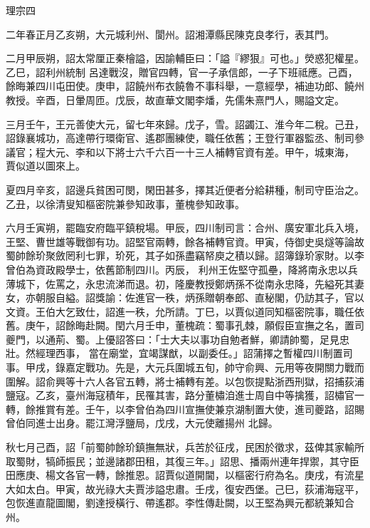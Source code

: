 
\begin{pinyinscope}

 理宗四



 二年春正月乙亥朔，大元城利州、閬州。詔湘潭縣民陳克良孝行，表其門。



 二月甲辰朔，詔太常厘正秦檜謚，因諭輔臣曰：「謚『繆狠』可也。」熒惑犯權星。乙巳，詔利州統制
 呂達戰沒，贈官四轉，官一子承信郎，一子下班祗應。己酉，餘晦兼四川屯田使。庚申，詔饒州布衣饒魯不事科舉，一意經學，補迪功郎、饒州教授。辛酉，日暈周匝。戊辰，故直華文閣李燔，先儒朱熹門人，賜謚文定。



 三月壬午，王元善使大元，留七年來歸。戊子，雪。詔蠲江、淮今年二稅。己丑，詔錄襄城功，高達帶行環衛官、遙郡團練使，職任依舊；王登行軍器監丞、制司參議官；程大元、李和以下將士六千六百一十三人補轉官資有差。甲午，城東海，
 賈似道以圖來上。



 夏四月辛亥，詔邊兵貧困可閔，閑田甚多，擇其近便者分給耕種，制司守臣治之。乙丑，以徐清叟知樞密院兼參知政事，董槐參知政事。



 六月壬寅朔，罷臨安府臨平鎮稅場。甲辰，四川制司言：合州、廣安軍北兵入境，王堅、曹世雄等戰御有功。詔堅官兩轉，餘各補轉官資。甲寅，侍御史吳燧等論故蜀帥餘玠聚斂罔利七罪，玠死，其子如孫盡竊帑庾之積以歸。詔簿錄玠家財。以李曾伯為資政殿學士，依舊節制四川。丙辰，
 利州王佐堅守孤壘，降將南永忠以兵薄城下，佐罵之，永忠流涕而退。初，隆慶教授鄭炳孫不從南永忠降，先縊死其妻女，亦朝服自縊。詔獎諭：佐進官一秩，炳孫贈朝奉郎、直秘閣，仍訪其子，官以文資。王伯大乞致仕，詔進一秩，允所請。丁巳，以賈似道同知樞密院事，職任依舊。庚午，詔餘晦赴闕。閏六月壬申，董槐疏：蜀事孔棘，願假臣宣撫之名，置司夔門，以通荊、蜀。上優詔答曰：「士大夫以事功自勉者鮮，卿請帥蜀，足見忠壯。然經理西事，
 當在廟堂，宜竭謀猷，以副委任。」詔蒲擇之暫權四川制置司事。甲戌，錄嘉定戰功。先是，大元兵圍城五旬，帥守俞興、元用等夜開關力戰而圍解。詔俞興等十六人各官五轉，將士補轉有差。以包恢提點浙西刑獄，招捕荻浦鹽寇。乙亥，臺州海寇積年，民罹其害，路分董橚洎進士周自中等擒獲，詔橚官一轉，餘推賞有差。壬午，以李曾伯為四川宣撫使兼京湖制置大使，進司夔路，詔賜曾伯同進士出身。罷江灣浮鹽局，戊戌，大元使離揚州
 北歸。



 秋七月己酉，詔「前蜀帥餘玠鎮撫無狀，兵苦於征戌，民困於徵求，茲俾其家輸所取蜀財，犒師振民；並邊諸郡田租，其復三年。」詔思、播兩州連年捍禦，其守臣田應庚、楊文各官一轉，餘推恩。詔賈似道開閫，以樞密行府為名。庚戌，有流星大如太白。甲寅，故光祿大夫賈涉謚忠肅。壬戌，復安西堡。己巳，荻浦海寇平，包恢進直龍圖閣，劉達授橫行、帶遙郡。李性傳赴闕，以王堅為興元都統兼知合州。




\end{pinyinscope}
